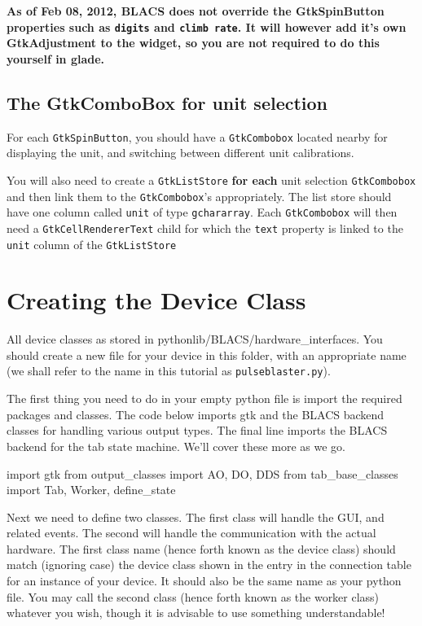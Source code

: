 \documentclass[12pt]{article}
\begin{document}
\textbf{As of Feb 08, 2012, BLACS does not override the GtkSpinButton properties such as \texttt{digits} and \texttt{climb rate}. It will however add it's own GtkAdjustment to the widget, so you are not required to do this yourself in glade.}

\subsection{The GtkComboBox for unit selection}\label{glade unit selection}
For each \texttt{GtkSpinButton}, you should have a \texttt{GtkCombobox} located nearby for displaying the unit, and switching between different unit calibrations.

You will also need to create a \texttt{GtkListStore} \textbf{for each} unit selection \texttt{GtkCombobox} and then link them to the \texttt{GtkCombobox}'s appropriately. The list store should have one column called \texttt{unit} of type \texttt{gchararray}. Each \texttt{GtkCombobox} will then need a \texttt{GtkCellRendererText} child for which the \texttt{text} property is linked to the \texttt{unit} column of the \texttt{GtkListStore}

\section{Creating the Device Class}\label{creating class}
All device classes as stored in pythonlib/BLACS/hardware\_interfaces. You should create a new file for your device in this folder, with an appropriate name (we shall refer to the name in this tutorial as \texttt{pulseblaster.py}).

The first thing you need to do in your empty python file is import the required packages and classes. The code below imports gtk and the BLACS backend classes for handling various output types. 
The final line imports the BLACS backend for the tab state machine. We'll cover these more as we go.
\begin{python}
import gtk
from output_classes import AO, DO, DDS
from tab_base_classes import Tab, Worker, define_state
\end{python}

Next we need to define two classes. The first class will handle the GUI, and related events. The second will handle the communication with the actual hardware. The first class name (hence forth known as the device class) should match (ignoring case) the device class shown in the entry in the connection table for an instance of your device. It should also be the same name as your python file. You may call the second class (hence forth known as the worker class) whatever you wish, though it is advisable to use something understandable!
\end{document}
